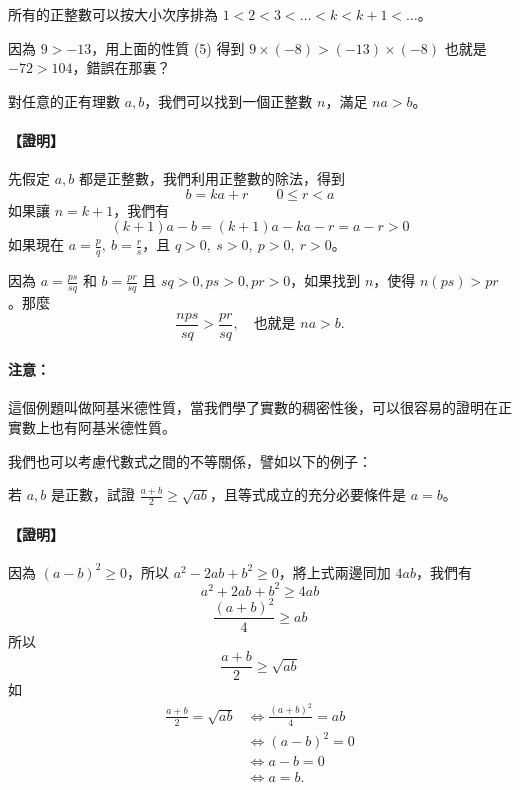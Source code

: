 \begin{example}\label{ex:b2_2-1-1}
所有的正整數可以按大小次序排為 $1<2<3<\dots < k < k+1 < \dots$。
\end{example}

\begin{example}\label{ex:b2_2-1-2}
因為 $9>-13$，用上面的性質 (5) 得到 $9\times (-8) > (-13)\times(-8)$ 也就是 $-72>104$，錯誤在那裏？
\end{example}

\begin{example}\label{ex:b2_2-1-3}
對任意的正有理數 $a, b$，我們可以找到一個正整數 $n$，滿足 $na>b$。
\end{example}
\paragraph{【證明】} 先假定 $a, b$ 都是正整數，我們利用正整數的除法，得到
\[
b=ka+r \qquad 0\le r < a
\]
如果讓 $n=k+1$，我們有
\[
(k+1)a-b = (k+1)a-ka-r = a-r > 0
\]
如果現在 $a=\frac{p}{q},\ b=\frac{r}{s}$，且 $q>0,\ s>0,\ p>0,\ r>0$。

因為 $a=\frac{ps}{sq}$ 和 $b=\frac{pr}{sq}$ 且 $sq>0, ps>0, pr>0$\label{note:b2-ch2-p28-ex3-pr}，如果找到 $n$，使得 $n(ps)>pr$。那麼
\[
\frac{nps}{sq} > \frac{pr}{sq},\quad \text{也就是 } na>b.
\]

\paragraph{注意：} 這個例題叫做阿基米德性質，當我們學了實數的稠密性後，可以很容易的證明在正實數上也有阿基米德性質。

我們也可以考慮代數式之間的不等關係，譬如以下的例子：

\begin{example}\label{ex:b2_2-1-4}
若 $a, b$ 是正數，試證 $\frac{a+b}{2} \ge \sqrt{ab}$，且等式成立的充分必要條件是 $a=b$。
\end{example}
\paragraph{【證明】} 因為 $(a-b)^2 \ge 0$，所以 $a^2-2ab+b^2 \ge 0$，將上式兩邊同加 $4ab$，我們有
\[
a^2+2ab+b^2 \ge 4ab
\]
\[
\frac{(a+b)^2}{4} \ge ab
\]
所以
\[
\frac{a+b}{2} \ge \sqrt{ab}
\]
如
\begin{align*}
\frac{a+b}{2} = \sqrt{ab} &\iff \frac{(a+b)^2}{4} = ab \\
&\iff (a-b)^2 = 0 \\
&\iff a-b = 0 \\
&\iff a = b.
\end{align*}

